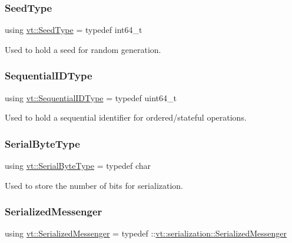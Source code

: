 \mbox{\label{namespacevt_ae2e13198bdef4d5b8e603d6c1c7f0969}} 
\subsubsection{\texorpdfstring{Seed\+Type}{SeedType}}
{\footnotesize\ttfamily using \hyperlink{namespacevt_ae2e13198bdef4d5b8e603d6c1c7f0969}{vt\+::\+Seed\+Type} = typedef int64\+\_\+t}



Used to hold a seed for random generation. 

\mbox{\label{namespacevt_a3063d4db3b879d6dd2c7b8d50995c7f6}} 
\subsubsection{\texorpdfstring{Sequential\+I\+D\+Type}{SequentialIDType}}
{\footnotesize\ttfamily using \hyperlink{namespacevt_a3063d4db3b879d6dd2c7b8d50995c7f6}{vt\+::\+Sequential\+I\+D\+Type} = typedef uint64\+\_\+t}



Used to hold a sequential identifier for ordered/stateful operations. 

\mbox{\label{namespacevt_ad48e08beb69a7f184fb1fdb4b7044174}} 
\subsubsection{\texorpdfstring{Serial\+Byte\+Type}{SerialByteType}}
{\footnotesize\ttfamily using \hyperlink{namespacevt_ad48e08beb69a7f184fb1fdb4b7044174}{vt\+::\+Serial\+Byte\+Type} = typedef char}



Used to store the number of bits for serialization. 

\mbox{\label{namespacevt_a490b7af99bdeb06e988d94a7ab389b43}} 
\subsubsection{\texorpdfstring{Serialized\+Messenger}{SerializedMessenger}}
{\footnotesize\ttfamily using \hyperlink{namespacevt_a490b7af99bdeb06e988d94a7ab389b43}{vt\+::\+Serialized\+Messenger} = typedef \+::\hyperlink{structvt_1_1serialization_1_1_serialized_messenger}{vt\+::serialization\+::\+Serialized\+Messenger}}

